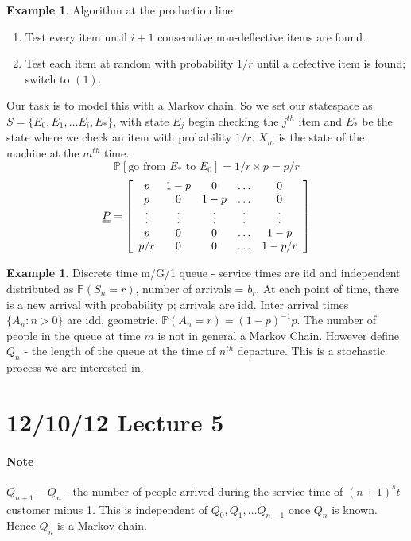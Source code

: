 \documentclass{article}
\theoremstyle{definition}
\newtheorem{ex}[thm]{Example}
\newcommand{\PP}{\mathbb{P}}
\begin{document}
\begin{ex}
Algorithm at the production line
\begin{enumerate}
\item
Test every item until $i+1$ consecutive non-deflective items are found.
\item
Test each item at random  with probability $1/r$ until a defective item is found; switch to $(1)$.
\end{enumerate}
Our task is to model this with a Markov chain. So we set our statespace as $S = \{E_0, E_1, \ldots E_i, E_{\ast} \}$, with state $E_j$ begin checking the $j^{th}$ item and $E_{\ast}$ be the state where we check an item with probability $1/r$. $X_m$ is the state of the machine at the $m^{th}$ time.
\[
\mathbb{P}[ \mbox{go from } E_{\ast} \mbox{ to } E_0 ] = 1/r \times p = p/r
\] 
\[
\uuline{P} = \left [ \begin{array}{ccccc} p & 1-p & 0 & \hdots & 0\\ p & 0 & 1 - p & \hdots & 0\\ \vdots & \vdots & \vdots & \vdots & \vdots\\ p & 0 & 0 & \hdots & 1 - p\\ p/r & 0 & 0 & \hdots & 1 - p/r \end{array} \right ]
\]
\end{ex}

\begin{ex} Discrete time m/G/1 queue - service times are iid and independent distributed as $\mathbb{P}(S_n = r)$, number of arrivals = $b_r$.  At each point of time, there is a new arrival with probability p; arrivals are idd. Inter arrival times $\{A_n : n > 0\}$ are idd, geometric. $\PP(A_n = r) = (1-p)^{-1}p$. The number of people in the queue at time $m$ is not in general a Markov Chain. However define\\

$Q_n$ - the length of the queue at the time of $n^{th}$ departure. This is a stochastic process we are interested in.
\end{ex}

\section{12/10/12 Lecture 5}

\paragraph*{Note} $Q_{n+1} - Q_n$ - the number of people arrived during the service time of $(n+1)^st$ customer minus 1. This is independent of $Q_0, Q_1, \ldots Q_{n-1}$ once $Q_n$ is known. Hence $Q_n$ is a Markov chain.
\end{document}
